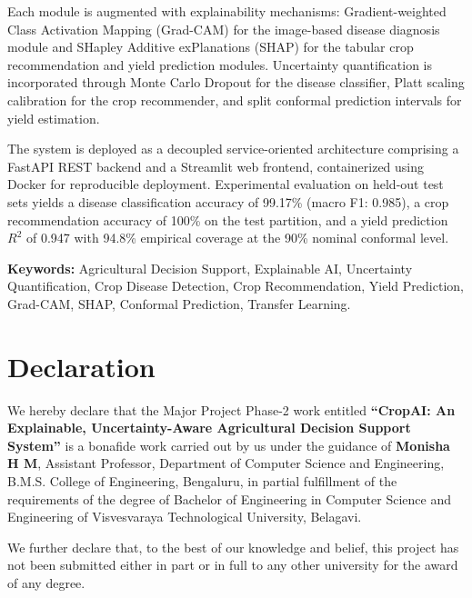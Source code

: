 \documentclass[12pt,a4paper]{report}
\begin{document}
Each module is augmented with explainability mechanisms: Gradient-weighted Class Activation Mapping (Grad-CAM) for the image-based disease diagnosis module and SHapley Additive exPlanations (SHAP) for the tabular crop recommendation and yield prediction modules. Uncertainty quantification is incorporated through Monte Carlo Dropout for the disease classifier, Platt scaling calibration for the crop recommender, and split conformal prediction intervals for yield estimation.

The system is deployed as a decoupled service-oriented architecture comprising a FastAPI REST backend and a Streamlit web frontend, containerized using Docker for reproducible deployment. Experimental evaluation on held-out test sets yields a disease classification accuracy of 99.17\% (macro F1: 0.985), a crop recommendation accuracy of 100\% on the test partition, and a yield prediction $R^2$ of 0.947 with 94.8\% empirical coverage at the 90\% nominal conformal level.

\noindent\textbf{Keywords:} Agricultural Decision Support, Explainable AI, Uncertainty Quantification, Crop Disease Detection, Crop Recommendation, Yield Prediction, Grad-CAM, SHAP, Conformal Prediction, Transfer Learning.

\chapter*{Declaration}
\thispagestyle{empty}

We hereby declare that the Major Project Phase-2 work entitled \textbf{``CropAI: An Explainable, Uncertainty-Aware Agricultural Decision Support System''} is a bonafide work carried out by us under the guidance of \textbf{Monisha H M}, Assistant Professor, Department of Computer Science and Engineering, B.M.S. College of Engineering, Bengaluru, in partial fulfillment of the requirements of the degree of Bachelor of Engineering in Computer Science and Engineering of Visvesvaraya Technological University, Belagavi.

We further declare that, to the best of our knowledge and belief, this project has not been submitted either in part or in full to any other university for the award of any degree.
\end{document}
